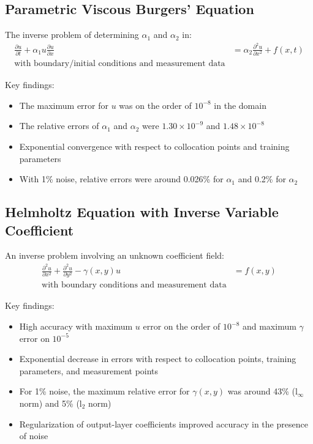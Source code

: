 \documentclass[11pt,a4paper]{article}
\begin{document}
\subsection{Parametric Viscous Burgers' Equation}

The inverse problem of determining $\alpha_1$ and $\alpha_2$ in:
\begin{align}
\frac{\partial u}{\partial t} + \alpha_1 u \frac{\partial u}{\partial x} &= \alpha_2 \frac{\partial^2 u}{\partial x^2} + f(x,t) \\
\text{with boundary/initial conditions and measurement data}
\end{align}

Key findings:
\begin{itemize}
    \item The maximum error for $u$ was on the order of $10^{-8}$ in the domain
    \item The relative errors of $\alpha_1$ and $\alpha_2$ were $1.30 \times 10^{-9}$ and $1.48 \times 10^{-8}$
    \item Exponential convergence with respect to collocation points and training parameters
    \item With 1\% noise, relative errors were around 0.026\% for $\alpha_1$ and 0.2\% for $\alpha_2$
\end{itemize}

\subsection{Helmholtz Equation with Inverse Variable Coefficient}

An inverse problem involving an unknown coefficient field:
\begin{align}
\frac{\partial^2 u}{\partial x^2} + \frac{\partial^2 u}{\partial y^2} - \gamma(x,y)u &= f(x,y) \\
\text{with boundary conditions and measurement data}
\end{align}

Key findings:
\begin{itemize}
    \item High accuracy with maximum $u$ error on the order of $10^{-8}$ and maximum $\gamma$ error on $10^{-5}$
    \item Exponential decrease in errors with respect to collocation points, training parameters, and measurement points
    \item For 1\% noise, the maximum relative error for $\gamma(x,y)$ was around 43\% (l$_\infty$ norm) and 5\% (l$_2$ norm)
    \item Regularization of output-layer coefficients improved accuracy in the presence of noise
\end{itemize}
\end{document}
